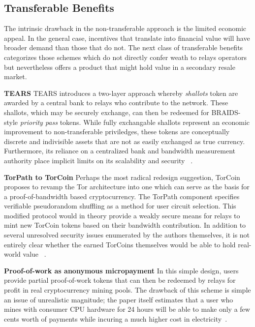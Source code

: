 \subsection{Transferable Benefits}

The intrinsic drawback in the non-transferable approach is the limited economic
appeal. In the general case, incentives that translate into financial value will
have broader demand than those that do not. The next class of transferable
benefits categorizes those schemes which do not directly confer weath to relays
operators but nevertheless offers a product that might hold value in a secondary
resale market.

\textbf{TEARS} TEARS introduces a two-layer approach whereby \emph{shallots}
token are awarded by a central bank to relays who contribute to the
network. These shallots, which may be securely exchange, can then be redeemed
for BRAIDS-style \emph{priority pass} tokens. While fully exchangable shallots
represent an economic improvement to non-transferable priviledges, these tokens
are conceptually discrete and indivisible assets that are not as easily
exchanged as true currency. Furthermore, its reliance on a centralized bank and
bandwidth measurement authority place implicit limits on its scalability and
security ~\cite{jansen2010recruiting}.

\textbf{TorPath to TorCoin} Perhaps the most radical redesign suggestion,
TorCoin proposes to revamp the Tor architecture into one which can serve as the
basis for a proof-of-bandwidth based cryptocurrency. The TorPath component
specifies verifiable pseudorandom shuffling as a method for user circuit
selection. This modified protocol would in theory provide a weakly secure means
for relays to mint new TorCoin tokens based on their bandwidth contribution. In
addition to several unresolved security issues enumerated by the authors
themselves, it is not entirely clear whether the earned TorCoins themselves
would be able to hold real-world value ~\cite{ghosh2014torpath}.

\textbf{Proof-of-work as anonymous micropayment} In this simple design,
users provide partial proof-of-work tokens that can then be redeemed by relays
for profit in real cryptocurrency mining pools. The drawback of this scheme is
simple an issue of unrealistic magnitude; the paper itself estimates that a user
who mines with consumer CPU hardware for 24 hours will be able to make only a
few cents worth of payments while incuring a much higher cost in
electricity~\cite{biryukov2015proof}.

